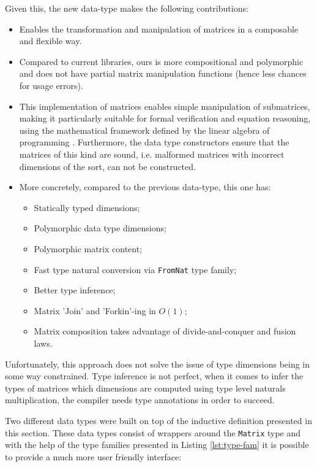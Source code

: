 \documentclass[
  oneside,
  11pt, a4paper,
  footinclude=true,
  headinclude=true,
  cleardoublepage=empty
]{scrbook}
\theoremstyle{definition}
\theoremstyle{definition}
\begin{document}
        Given this, the new data-type makes the following contributions:
        
        \begin{itemize}
            \item Enables the transformation and manipulation of matrices in a composable and flexible way.
            \item Compared to current libraries, ours is more compositional and polymorphic and does not have partial matrix manipulation functions (hence less chances for usage errors). 
            \item This implementation of matrices enables simple manipulation of submatrices, making it particularly suitable for formal verification and equation reasoning, using the mathematical framework defined by the linear algebra of programming \citep{oliveira2012towards}. Furthermore, the data type constructors ensure that the matrices of this kind are sound, i.e. malformed matrices with incorrect dimensions of the sort, can not be constructed.
            \item More concretely, compared to the previous data-type, this one has:
                  \begin{itemize}
                    \item Statically typed dimensions;
                    \item Polymorphic data type dimensions;
                    \item Polymorphic matrix content;
                    \item Fast type natural conversion via \texttt{FromNat} type family;
                    \item Better type inference;
                    \item Matrix 'Join' and 'Forkin'-ing in $O(1)$;
                    \item Matrix composition takes advantage of divide-and-conquer and fusion laws.
                  \end{itemize}
        \end{itemize}
        
        Unfortunately, this approach does not solve the issue of type dimensions being in some way constrained. Type inference is not perfect, when it comes to infer the types of matrices which dimensions are computed using type level naturals multiplication, the compiler needs type annotations in order to succeed.
        
        Two different data types were built on top of the inductive definition presented in this section. These data types consist of wrappers around the \texttt{Matrix} type and with the help of the type families presented in Listing \ref{lst:type-fam} it is possible to provide a much more user friendly interface:
        
\end{document}
